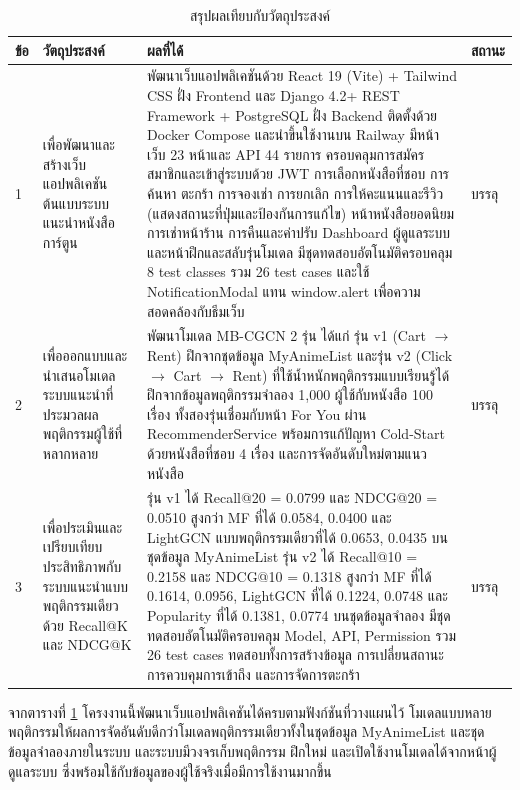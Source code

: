 \begin{table}[H]
\centering
\caption{สรุปผลเทียบกับวัตถุประสงค์}
\label{tab:obj_result}
\small
\begin{tabular}{|p{0.6cm}|p{3.3cm}|p{5.9cm}|p{1.5cm}|}
\hline
\textbf{ข้อ} & \textbf{วัตถุประสงค์} & \textbf{ผลที่ได้} & \textbf{สถานะ} \\
\hline
1 & เพื่อพัฒนาและสร้างเว็บแอปพลิเคชันต้นแบบระบบแนะนำหนังสือการ์ตูน &
พัฒนาเว็บแอปพลิเคชันด้วย React 19 (Vite) + Tailwind CSS ฝั่ง Frontend และ Django 4.2+ REST Framework + PostgreSQL ฝั่ง Backend ติดตั้งด้วย Docker Compose และนำขึ้นใช้งานบน Railway มีหน้าเว็บ 23 หน้าและ API 44 รายการ ครอบคลุมการสมัครสมาชิกและเข้าสู่ระบบด้วย JWT การเลือกหนังสือที่ชอบ การค้นหา ตะกร้า การจองเช่า การยกเลิก การให้คะแนนและรีวิว (แสดงสถานะที่ปุ่มและป้องกันการแก้ไข) หน้าหนังสือยอดนิยม การเช่าหน้าร้าน การคืนและค่าปรับ Dashboard ผู้ดูแลระบบ และหน้าฝึกและสลับรุ่นโมเดล มีชุดทดสอบอัตโนมัติครอบคลุม 8 test classes รวม 26 test cases และใช้ NotificationModal แทน window.alert เพื่อความสอดคล้องกับธีมเว็บ & บรรลุ \\ \hline
2 & เพื่อออกแบบและนำเสนอโมเดลระบบแนะนำที่ประมวลผลพฤติกรรมผู้ใช้ที่หลากหลาย &
พัฒนาโมเดล MB-CGCN 2 รุ่น ได้แก่ รุ่น v1 (Cart $\rightarrow$ Rent) ฝึกจากชุดข้อมูล MyAnimeList และรุ่น v2 (Click $\rightarrow$ Cart $\rightarrow$ Rent) ที่ใช้น้ำหนักพฤติกรรมแบบเรียนรู้ได้ ฝึกจากข้อมูลพฤติกรรมจำลอง 1,000 ผู้ใช้กับหนังสือ 100 เรื่อง ทั้งสองรุ่นเชื่อมกับหน้า For You ผ่าน RecommenderService พร้อมการแก้ปัญหา Cold-Start ด้วยหนังสือที่ชอบ 4 เรื่อง และการจัดอันดับใหม่ตามแนวหนังสือ & บรรลุ \\ \hline
3 & เพื่อประเมินและเปรียบเทียบประสิทธิภาพกับระบบแนะนำแบบพฤติกรรมเดียวด้วย Recall@K และ NDCG@K &
รุ่น v1 ได้ Recall@20 = 0.0799 และ NDCG@20 = 0.0510 สูงกว่า MF ที่ได้ 0.0584, 0.0400 และ LightGCN แบบพฤติกรรมเดียวที่ได้ 0.0653, 0.0435 บนชุดข้อมูล MyAnimeList รุ่น v2 ได้ Recall@10 = 0.2158 และ NDCG@10 = 0.1318 สูงกว่า MF ที่ได้ 0.1614, 0.0956, LightGCN ที่ได้ 0.1224, 0.0748 และ Popularity ที่ได้ 0.1381, 0.0774 บนชุดข้อมูลจำลอง มีชุดทดสอบอัตโนมัติครอบคลุม Model, API, Permission รวม 26 test cases ทดสอบทั้งการสร้างข้อมูล การเปลี่ยนสถานะ การควบคุมการเข้าถึง และการจัดการตะกร้า & บรรลุ \\
\hline
\end{tabular}
\end{table}

จากตารางที่ \ref{tab:obj_result} โครงงานนี้พัฒนาเว็บแอปพลิเคชันได้ครบตามฟังก์ชันที่วางแผนไว้ โมเดลแบบหลายพฤติกรรมให้ผลการจัดอันดับดีกว่าโมเดลพฤติกรรมเดียวทั้งในชุดข้อมูล MyAnimeList และชุดข้อมูลจำลองภายในระบบ และระบบมีวงจรเก็บพฤติกรรม ฝึกใหม่ และเปิดใช้งานโมเดลได้จากหน้าผู้ดูแลระบบ ซึ่งพร้อมใช้กับข้อมูลของผู้ใช้จริงเมื่อมีการใช้งานมากขึ้น

